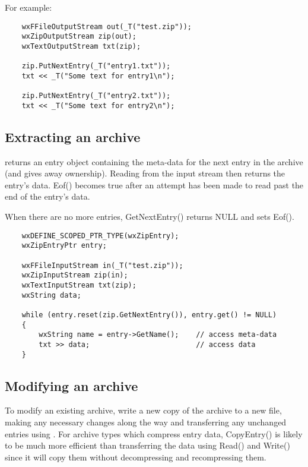 For example:

\begin{verbatim}
    wxFFileOutputStream out(_T("test.zip"));
    wxZipOutputStream zip(out);
    wxTextOutputStream txt(zip);

    zip.PutNextEntry(_T("entry1.txt"));
    txt << _T("Some text for entry1\n");

    zip.PutNextEntry(_T("entry2.txt"));
    txt << _T("Some text for entry2\n");

\end{verbatim}


\subsection{Extracting an archive}\label{wxarcextract}


 returns an
entry object containing the meta-data for the next entry in the archive
(and gives away ownership). Reading from the input stream then returns
the entry's data. Eof() becomes true after an attempt has been made to
read past the end of the entry's data.

When there are no more entries, GetNextEntry() returns NULL and sets Eof().

\begin{verbatim}
    wxDEFINE_SCOPED_PTR_TYPE(wxZipEntry);
    wxZipEntryPtr entry;

    wxFFileInputStream in(_T("test.zip"));
    wxZipInputStream zip(in);
    wxTextInputStream txt(zip);
    wxString data;

    while (entry.reset(zip.GetNextEntry()), entry.get() != NULL)
    {
        wxString name = entry->GetName();    // access meta-data
        txt >> data;                         // access data
    }

\end{verbatim}


\subsection{Modifying an archive}\label{wxarcmodify}


To modify an existing archive, write a new copy of the archive to a new file,
making any necessary changes along the way and transferring any unchanged
entries using .
For archive types which compress entry data, CopyEntry() is likely to be
much more efficient than transferring the data using Read() and Write()
since it will copy them without decompressing and recompressing them.

